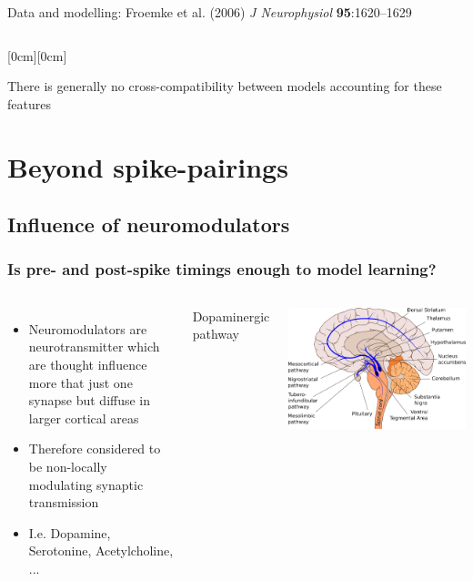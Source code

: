 \documentclass{beamer}
\begin{document}
\begin{frame}
\begin{columns}[T]
    \tiny{Data and modelling: Froemke et al. (2006) \textit{J Neurophysiol} \textbf{95}:1620--1629}
  \end{columns}
\hspace*{5.5cm}\raisebox{1.3cm}[0cm][0cm]{}

\vspace*{3mm}
\alert{There is generally no cross-compatibility between models accounting for these features}
\end{frame}


\section{Beyond spike-pairings}
\subsection{Influence of neuromodulators}


\begin{frame}
\frametitle{Is pre- and post-spike timings enough to model learning?}

\begin{columns}[T]
    

    \begin{itemize}
            \item Neuromodulators are neurotransmitter which are thought influence more that just one synapse but diffuse in larger cortical areas
            \item Therefore considered to be non-locally modulating synaptic transmission
            \item I.e. Dopamine, Serotonine, Acetylcholine, ...
    \end{itemize}

    \begin{center}
        Dopaminergic pathway
    \end{center}
    \includegraphics[width=\textwidth]{./figures/dopa_path.png}

  \end{columns}


\end{frame}
\end{document}
